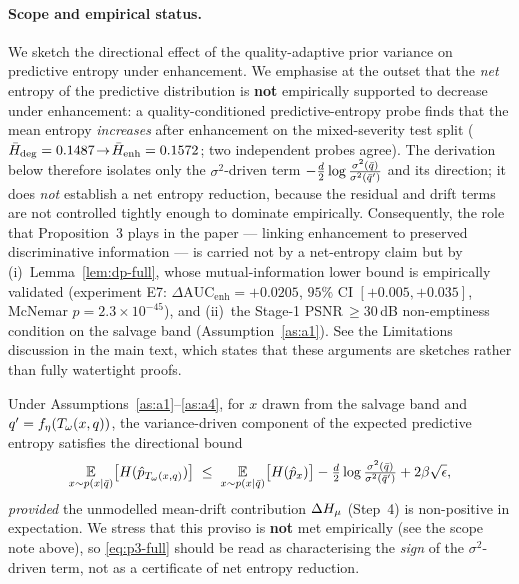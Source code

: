 \paragraph{Scope and empirical status.}
We sketch the directional effect of the quality-adaptive prior variance on predictive
entropy under enhancement. We emphasise at the outset that the \emph{net} entropy of the
predictive distribution is \textbf{not} empirically supported to decrease under
enhancement: a quality-conditioned predictive-entropy probe finds that the mean entropy
\emph{increases} after enhancement on the mixed-severity test split
($\bar{H}_{\mathrm{deg}}=0.1487\!\to\!\bar{H}_{\mathrm{enh}}=0.1572$; two
independent probes agree). The derivation below therefore isolates only the
$\sigma^2$-driven term $-\tfrac{d}{2}\log\tfrac{\sigma^2(\bar{q})}{\sigma^2(\bar{q}')}$ and
its direction; it does \emph{not} establish a net entropy reduction, because the
residual and drift terms are not controlled tightly enough to dominate empirically.
Consequently, the role that Proposition~3 plays in the paper --- linking enhancement to
preserved discriminative information --- is carried not by a net-entropy claim but by
(i)~Lemma~\ref{lem:dp-full}, whose mutual-information lower bound is empirically validated
(experiment E7: $\Delta\mathrm{AUC}_{\mathrm{enh}}=+0.0205$, $95\%$ CI $[+0.005,+0.035]$,
McNemar $p=2.3\times10^{-45}$), and (ii)~the Stage-1 PSNR$\,\geq 30$\,dB non-emptiness
condition on the salvage band (Assumption~\ref{as:a1}). See the Limitations discussion in
the main text, which states that these arguments are sketches rather than fully watertight
proofs.

\begin{proposition}\label{prop:entropy-full}\label{prop:entropy}
Under Assumptions~\ref{as:a1}--\ref{as:a4}, for $x$ drawn from the salvage band and
$q'=f_\eta(T_\omega(x,q))$, the variance-driven component of the expected predictive entropy
satisfies the directional bound
\begin{equation}
\operatorname*{\mathbb{E}}_{x\sim p(x\mid\bar{q})}\!\big[H(\hat{p}_{T_\omega(x,q)})\big] \;\leq\;
\operatorname*{\mathbb{E}}_{x\sim p(x\mid\bar{q})}\!\big[H(\hat{p}_x)\big]
- \tfrac{d}{2}\log\tfrac{\sigma^2(\bar{q})}{\sigma^2(\bar{q}')} + 2\beta\sqrt{\epsilon},
\label{eq:p3-full}
\end{equation}
\emph{provided} the unmodelled mean-drift contribution $\Delta H_\mu$ (Step~4) is
non-positive in expectation. We stress that this proviso is \textbf{not} met empirically
(see the scope note above), so \eqref{eq:p3-full} should be read as characterising the
\emph{sign} of the $\sigma^2$-driven term, not as a certificate of net entropy reduction.
\end{proposition}

